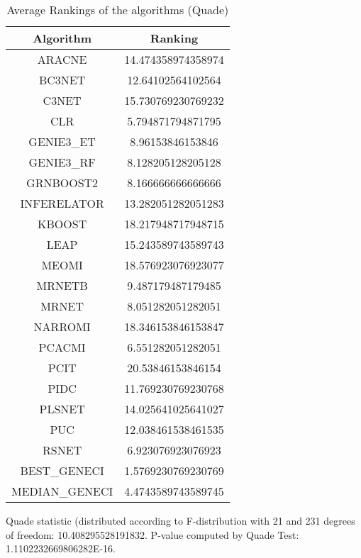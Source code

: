 \documentclass[a4paper,10pt]{article}
\begin{document}
\begin{landscape}
\begin{table}[!htp]
\centering
\caption{Average Rankings of the algorithms (Quade)
}\begin{tabular}{c|c}
Algorithm&Ranking\\
\hline
ARACNE&14.474358974358974\\
BC3NET&12.64102564102564\\
C3NET&15.730769230769232\\
CLR&5.794871794871795\\
GENIE3_ET&8.96153846153846\\
GENIE3_RF&8.128205128205128\\
GRNBOOST2&8.166666666666666\\
INFERELATOR&13.282051282051283\\
KBOOST&18.217948717948715\\
LEAP&15.243589743589743\\
MEOMI&18.576923076923077\\
MRNETB&9.487179487179485\\
MRNET&8.051282051282051\\
NARROMI&18.346153846153847\\
PCACMI&6.551282051282051\\
PCIT&20.53846153846154\\
PIDC&11.769230769230768\\
PLSNET&14.025641025641027\\
PUC&12.038461538461535\\
RSNET&6.923076923076923\\
BEST_GENECI&1.5769230769230769\\
MEDIAN_GENECI&4.4743589743589745\\
\end{tabular}
\end{table}
Quade statistic (distributed according to F-distribution with 21 and 231 degrees of freedom: 10.408295528191832. 
P-value computed by Quade Test: 1.1102232669806282E-16.\newline


\newpage


\end{landscape}
\end{document}

